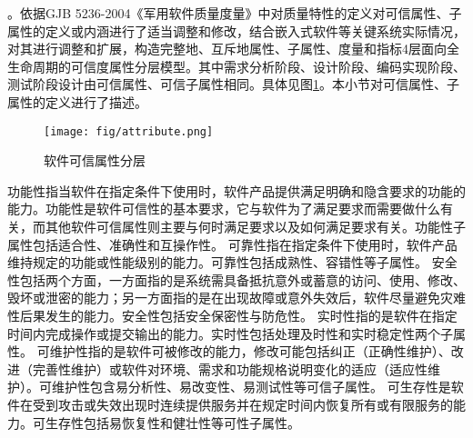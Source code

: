 。依据GJB 5236-2004《军用软件质量度量》中对质量特性的定义对可信属性、子属性的定义或内涵进行了适当调整和修改，结合嵌入式软件等关键系统实际情况，对其进行调整和扩展，构造完整地、互斥地属性、子属性、度量和指标4层面向全生命周期的可信度属性分层模型。其中需求分析阶段、设计阶段、编码实现阶段、测试阶段设计由可信属性、可信子属性相同。具体见图\ref{attribute}。本小节对可信属性、子属性的定义进行了描述。 
\begin{figure}[htb]
	\centering
	\texttt{[image: fig/attribute.png]}
	\caption{软件可信属性分层}
	\label{attribute}
\end{figure}
功能性指当软件在指定条件下使用时，软件产品提供满足明确和隐含要求的功能的能力。功能性是软件可信性的基本要求，它与软件为了满足要求而需要做什么有关，而其他软件可信属性则主要与何时满足要求以及如何满足要求有关。功能性子属性包括适合性、准确性和互操作性。
可靠性指在指定条件下使用时，软件产品维持规定的功能或性能级别的能力。可靠性包括成熟性、容错性等子属性。
安全性包括两个方面，一方面指的是系统需具备抵抗意外或蓄意的访问、使用、修改、毁坏或泄密的能力；另一方面指的是在出现故障或意外失效后，软件尽量避免灾难性后果发生的能力。安全性包括安全保密性与防危性。
实时性指的是软件在指定时间内完成操作或提交输出的能力。实时性包括处理及时性和实时稳定性两个子属性。
可维护性指的是软件可被修改的能力，修改可能包括纠正（正确性维护）、改进（完善性维护）或软件对环境、需求和功能规格说明变化的适应（适应性维护）。可维护性包含易分析性、易改变性、易测试性等可信子属性。
可生存性是软件在受到攻击或失效出现时连续提供服务并在规定时间内恢复所有或有限服务的能力。可生存性包括易恢复性和健壮性等可性子属性。

